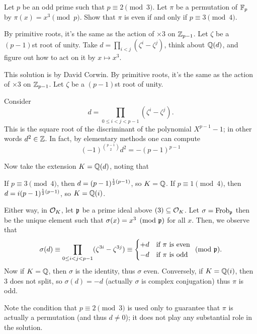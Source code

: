 \begin{problem}
	[Putnam 2012 B6]
	\yod
	Let $p$ be an odd prime such that $p \equiv 2 \pmod 3$.
	Let $\pi$ be a permutation of $\mathbb F_p$ by $\pi(x) = x^3 \pmod p$.
	Show that $\pi$ is even if and only if $p \equiv 3 \pmod 4$.
	\begin{hint}
		By primitive roots, it's the same as the action of $\times 3$ on $\mathbb Z_{p-1}$.
		Let $\zeta$ be a $(p-1)$st root of unity.
		Take $d = \prod_{i < j} (\zeta^i - \zeta^j)$, think about $\mathbb Q(d)$,
		and figure out how to act on it by $x \mapsto x^3$.
	\end{hint}
	\begin{sol}
		This solution is by David Corwin.
		By primitive roots, it's the same as the action of $\times 3$ on $\mathbb Z_{p-1}$.
		Let $\zeta$ be a $(p-1)$st root of unity.

		Consider 
		\[ d = \prod_{0 \le i < j < p-1} (\zeta^i - \zeta^j). \]
		This is the square root of the discriminant of 
		the polynomial $X^{p-1}-1$; in other words $d^2 \in \mathbb Z$.
		In fact, by elementary methods one can compute
		\[ (-1)^{\binom{p-1}{2}} d^2 = -(p-1)^{p-1} \]

		Now take the extension $K = \mathbb Q(d)$, noting that
		\begin{itemize}
			\ii If $p \equiv 3 \pmod 4$, then $d = (p-1)^{\frac{1}{2}(p-1)}$, so $K = \mathbb Q$.
			\ii If $p \equiv 1 \pmod 4$, then $d = i(p-1)^{\frac{1}{2}(p-1)}$, so $K = \mathbb Q(i)$.
		\end{itemize}
		Either way, in $\mathcal O_K$, let $\mathfrak p$ be a prime ideal above $(3) \subseteq \mathcal O_K$.
		Let $\sigma = \mathrm{Frob}_\mathfrak p$ then be the unique element such that
		$\sigma(x) = x^3 \pmod{\mathfrak p}$ for all $x$.
		Then, we observe that
		\[
			\sigma(d) \equiv \prod_{0 \le i < j < p-1} (\zeta^{3i} - \zeta^{3j})
			\equiv \begin{cases}
				+d & \text{if $\pi$ is even} \\
				-d & \text{if $\pi$ is odd}
			\end{cases} \pmod{\mathfrak p}.
		\]
		Now if $K = \mathbb Q$, then $\sigma$ is the identity, thus $\sigma$ even.
		Conversely, if $K = \mathbb Q(i)$, then $3$ does not split, so $\sigma(d) = -d$
		(actually $\sigma$ is complex conjugation) thus $\pi$ is odd.

		Note the condition that $p \equiv 2 \pmod 3$ is used only
		to guarantee that $\pi$ is actually a permutation (and thus $d \neq 0$);
		it does not play any substantial role in the solution.
	\end{sol}
\end{problem}
